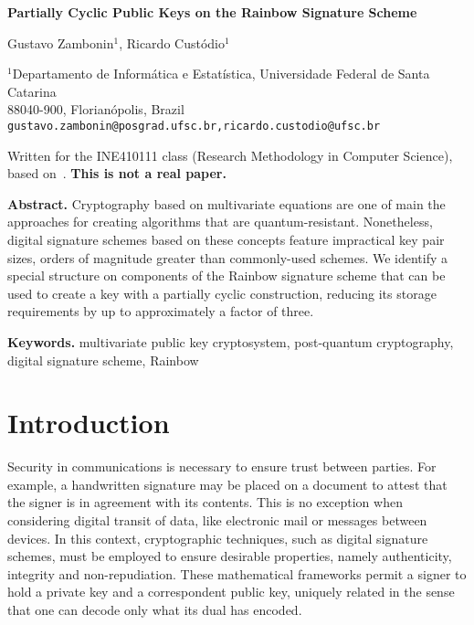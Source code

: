 \documentclass[a4paper, 14pt]{extarticle}
\begin{document}
\begin{center}
    {\Large\bf Partially Cyclic Public Keys on the Rainbow Signature Scheme} \vspace{.75cm}
    
    Gustavo Zambonin$^{1}$, Ricardo Custódio$^{1}$
    
    $^{1}$Departamento de Informática e Estatística, Universidade Federal de Santa Catarina \\
    88040-900, Florianópolis, Brazil \\
    \texttt{gustavo.zambonin@posgrad.ufsc.br,ricardo.custodio@ufsc.br}
    
     Written for the INE410111 class (Research Methodology in Computer Science), based on~\cite{Petzoldt:phd:2013:jul}. \textbf{This is not a real paper.} \vspace{.75cm}
\end{center}

\textbf{Abstract.} Cryptography based on multivariate equations are one of main the approaches for creating algorithms that are quantum-resistant. Nonetheless, digital signature schemes based on these concepts feature impractical key pair sizes, orders of magnitude greater than commonly-used schemes. We identify a special structure on components of the Rainbow signature scheme that can be used to create a key with a partially cyclic construction, reducing its storage requirements by up to approximately a factor of three.

\textbf{Keywords.} multivariate public key cryptosystem, post-quantum cryptography, digital signature scheme, Rainbow

\section{Introduction}\label{sec:intro}

Security in communications is necessary to ensure trust between parties. For example, a handwritten signature may be placed on a document to attest that the signer is in agreement with its contents. This is no exception when considering digital transit of data, like electronic mail or messages between devices. In this context, cryptographic techniques, such as digital signature schemes, must be employed to ensure desirable properties, namely authenticity, integrity and non-repudiation. These mathematical frameworks permit a signer to hold a private key and a correspondent public key, uniquely related in the sense that one can decode only what its dual has encoded. 
\end{document}
